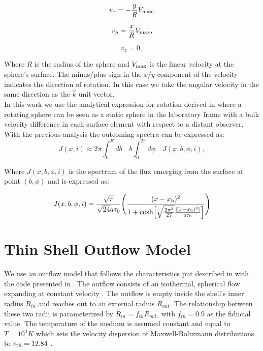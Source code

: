 \begin{equation}
	v_{x}=-\frac{y}{R}V_{\rm max}, \label{subeq1}
\end{equation}

\begin{equation}
	v_{y}=\frac{x}{R}V_{\rm max}, \label{subeq2}
\end{equation}

\begin{equation}
	v_{z}=0, \label{subeq3}
\end{equation}

Where $R$ is the radius of the sphere and $V_{\rm max}$ is the linear velocity at the sphere's surface. The minus/plus sign in the $x$/$y$-component of the velocity indicates the direction of rotation. In this case we take the angular velocity in the same direction as the $\hat{k}$ unit vector.\\

In this work we use the analytical expression for rotation derived in \cite{Garavito14} where a rotating sphere can be seen as a static sphere in the laboratory frame with a bulk velocity difference in each surface element with respect to a distant observer. With the previous analysis the outcoming spectra can be expressed as:\\

\begin{equation}
J(x,i) \approx 2\pi \int_{0}^{R} db \quad b \int_0^{2\pi} d\phi \quad J(x,b,\phi,i),
\end{equation}

Where $J(x, b, \phi, i)$ is the spectrum of the flux emerging from the surface at point $(b, \phi)$ and is expressed as: 

\begin{equation}
	J(x,b,\phi,i)=\frac{\sqrt{\pi}}{\sqrt{24}a\tau_0}\Bigg{(}\frac{(x-x_{\rm
			b})^2}{1+{\rm cosh}\Big{[}\sqrt{\frac{2\pi^3}{27}}\frac{|(x-x_{\rm
				b})^3|}{a\tau_0}\Big{]}}\Bigg{)} 
\end{equation}


\section{Thin Shell Outflow Model}

We use an outflow model that follows the characteristics put described in \cite{Verhamme06} with the code presented in \cite{Orsi12}. The outflow consists of an isothermal, spherical flow expanding at constant velocity \vout.  The outflow is empty inside the shell's inner radius $R_{in}$ and reaches out to an external radius $R_{out}$. The relationship between these two radii is parameterized by $R_{in} = f_{th}R_{out}$, with $f_{th}=0.9$ as the fiducial value. The temperature of the medium is assumed constant and equal to $T=10^4 K$ which sets the velocity dispersion of Maxwell-Boltzmann distributions to $v_{\rm th}=12.84$ \kms. \\

